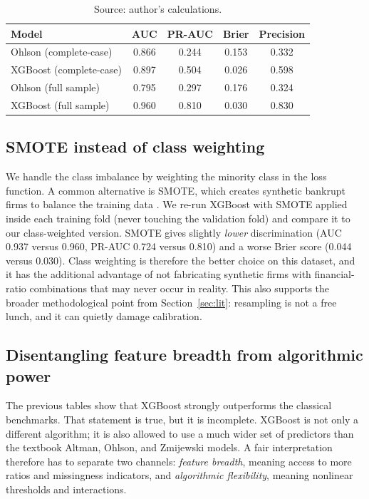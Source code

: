 \documentclass[12pt,a4paper]{article}
\begin{document}
\begin{table}[H]
\centering
\caption{Complete-case analysis at H1 (rows with no missing values,
$n=3{,}031$, bankruptcy rate 3.4\%). Full-sample figures shown for comparison.}
\label{tab:robust-cc}
\small
\begin{tabular}{lcccc}
\toprule
Model & AUC & PR-AUC & Brier & Precision \\
\midrule
Ohlson (complete-case)  & 0.866 & 0.244 & 0.153 & 0.332 \\
XGBoost (complete-case) & 0.897 & 0.504 & 0.026 & 0.598 \\
\midrule
Ohlson (full sample)    & 0.795 & 0.297 & 0.176 & 0.324 \\
XGBoost (full sample)   & 0.960 & 0.810 & 0.030 & 0.830 \\
\bottomrule
\end{tabular}
\caption*{\footnotesize Source: author's calculations.}
\end{table}

\subsection{SMOTE instead of class weighting}

We handle the class imbalance by weighting the minority class in the loss
function. A common alternative is SMOTE, which creates synthetic bankrupt
firms to balance the training data \citep{chawla2002}. We re-run XGBoost with
SMOTE applied inside each training fold (never touching the validation fold)
and compare it to our class-weighted version. SMOTE gives slightly
\emph{lower} discrimination (AUC 0.937 versus 0.960, PR-AUC 0.724 versus
0.810) and a worse Brier score (0.044 versus 0.030). Class weighting is
therefore the better choice on this dataset, and it has the additional
advantage of not fabricating synthetic firms with financial-ratio
combinations that may never occur in reality. This also supports the broader
methodological point from Section~\ref{sec:lit}: resampling is not a free
lunch, and it can quietly damage calibration.

\subsection{Disentangling feature breadth from algorithmic power}
\label{sec:feature-breadth}

The previous tables show that XGBoost strongly outperforms the classical
benchmarks. That statement is true, but it is incomplete. XGBoost is not only
a different algorithm; it is also allowed to use a much wider set of predictors
than the textbook Altman, Ohlson, and Zmijewski models. A fair interpretation
therefore has to separate two channels: \emph{feature breadth}, meaning access
to more ratios and missingness indicators, and \emph{algorithmic flexibility},
meaning nonlinear thresholds and interactions.
\end{document}
